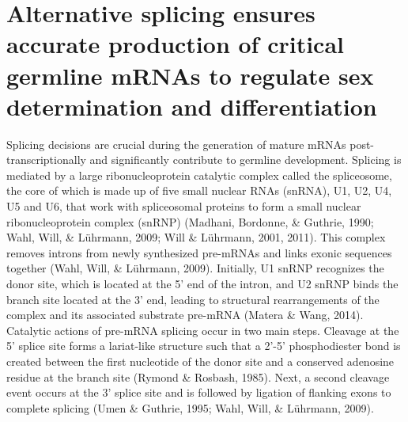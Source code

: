 \documentclass[12pt,oneside]{reedthesis}
\begin{document}
\hypertarget{alternative-splicing-ensures-accurate-production-of-critical-germline-mrnas-to-regulate-sex-determination-and-differentiation}{%
\section{Alternative splicing ensures accurate production of critical germline mRNAs to regulate sex determination and differentiation}\label{alternative-splicing-ensures-accurate-production-of-critical-germline-mrnas-to-regulate-sex-determination-and-differentiation}}

Splicing decisions are crucial during the generation of mature mRNAs
post-transcriptionally and significantly contribute to germline
development. Splicing is mediated by a large ribonucleoprotein catalytic
complex called the spliceosome, the core of which is made up of five
small nuclear RNAs (snRNA), U1, U2, U4, U5 and U6, that work with
spliceosomal proteins to form a small nuclear ribonucleoprotein complex
(snRNP) (Madhani, Bordonne, \& Guthrie, 1990; Wahl, Will, \& Lührmann, 2009; Will \& Lührmann, 2001, 2011). This
complex removes introns from newly synthesized pre-mRNAs and links
exonic sequences together (Wahl, Will, \& Lührmann, 2009). Initially, U1 snRNP recognizes
the donor site, which is located at the 5' end of the intron, and U2
snRNP binds the branch site located at the 3' end, leading to structural
rearrangements of the complex and its associated substrate pre-mRNA
(Matera \& Wang, 2014). Catalytic actions of pre-mRNA splicing occur in two
main steps. Cleavage at the 5' splice site forms a lariat-like structure
such that a 2'-5' phosphodiester bond is created between the first
nucleotide of the donor site and a conserved adenosine residue at the
branch site (Rymond \& Rosbash, 1985). Next, a second cleavage event occurs at
the 3' splice site and is followed by ligation of flanking exons to
complete splicing (Umen \& Guthrie, 1995; Wahl, Will, \& Lührmann, 2009).
\end{document}
